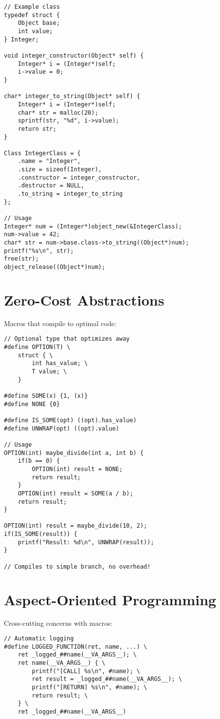 \begin{description}[style=nextline,leftmargin=0pt]
\begin{lstlisting}
// Example class
typedef struct {
    Object base;
    int value;
} Integer;

void integer_constructor(Object* self) {
    Integer* i = (Integer*)self;
    i->value = 0;
}

char* integer_to_string(Object* self) {
    Integer* i = (Integer*)self;
    char* str = malloc(20);
    sprintf(str, "%d", i->value);
    return str;
}

Class IntegerClass = {
    .name = "Integer",
    .size = sizeof(Integer),
    .constructor = integer_constructor,
    .destructor = NULL,
    .to_string = integer_to_string
};

// Usage
Integer* num = (Integer*)object_new(&IntegerClass);
num->value = 42;
char* str = num->base.class->to_string((Object*)num);
printf("%s\n", str);
free(str);
object_release((Object*)num);
\end{lstlisting}

\section{Zero-Cost Abstractions}

Macros that compile to optimal code:

\begin{lstlisting}
// Optional type that optimizes away
#define OPTION(T) \
    struct { \
        int has_value; \
        T value; \
    }

#define SOME(x) {1, (x)}
#define NONE {0}

#define IS_SOME(opt) ((opt).has_value)
#define UNWRAP(opt) ((opt).value)

// Usage
OPTION(int) maybe_divide(int a, int b) {
    if(b == 0) {
        OPTION(int) result = NONE;
        return result;
    }
    OPTION(int) result = SOME(a / b);
    return result;
}

OPTION(int) result = maybe_divide(10, 2);
if(IS_SOME(result)) {
    printf("Result: %d\n", UNWRAP(result));
}

// Compiles to simple branch, no overhead!
\end{lstlisting}

\section{Aspect-Oriented Programming}

Cross-cutting concerns with macros:

\begin{lstlisting}
// Automatic logging
#define LOGGED_FUNCTION(ret, name, ...) \
    ret _logged_##name(__VA_ARGS__); \
    ret name(__VA_ARGS__) { \
        printf("[CALL] %s\n", #name); \
        ret result = _logged_##name(__VA_ARGS__); \
        printf("[RETURN] %s\n", #name); \
        return result; \
    } \
    ret _logged_##name(__VA_ARGS__)


\end{lstlisting}
\end{description}
